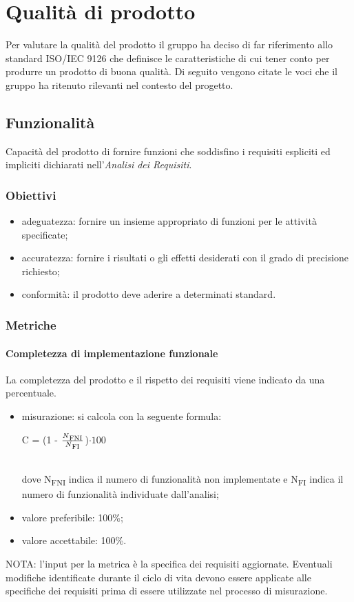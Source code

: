 \section{Qualità di prodotto}
Per valutare la qualità del prodotto il gruppo ha deciso di far riferimento allo standard ISO/IEC 9126 che definisce le caratteristiche di cui tener conto per produrre un prodotto di buona qualità.
Di seguito vengono citate le voci che il gruppo ha ritenuto rilevanti nel contesto del progetto.
	\subsection{Funzionalità}
	Capacità del prodotto di fornire funzioni che soddisfino i requisiti espliciti ed impliciti dichiarati nell'\textit{Analisi dei Requisiti}.
		\subsubsection{Obiettivi}
		\begin{itemize}
			\item adeguatezza: fornire un insieme appropriato di funzioni per le attività specificate;
			\item accuratezza: fornire i risultati o gli effetti desiderati con il grado di precisione richiesto;
			\item conformità: il prodotto deve aderire a determinati standard. %
		\end{itemize}
		\subsubsection{Metriche}
			\paragraph{Completezza di implementazione funzionale}
			La completezza del prodotto e il rispetto dei requisiti viene indicato da una percentuale.
			\begin{itemize}
			\item misurazione: si calcola con la seguente formula: \\
			\centerline { C = (1 - \(\frac{N\textsubscript{FNI}}{N\textsubscript{FI}} \))$ \cdot  100$ } \\
			dove N\textsubscript{FNI} indica il numero di funzionalità non implementate e N\textsubscript{FI} indica il numero di funzionalità individuate dall'analisi;
			\item valore preferibile: 100\%;
			\item valore accettabile: 100\%.
			\end{itemize}
			NOTA: l'input per la metrica è la specifica dei requisiti aggiornate. Eventuali modifiche identificate durante il ciclo di vita devono essere applicate alle specifiche dei requisiti prima di essere utilizzate nel processo di misurazione.
